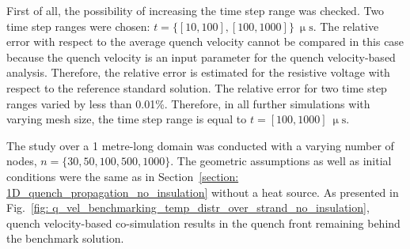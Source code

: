 First of all, the possibility of increasing the time step range was checked. Two time step ranges were chosen: $t=\{[10, 100], [100, 1000]\}~\upmu \text{s}$. The relative error with respect to the average quench velocity cannot be compared in this case because the quench velocity is an input parameter for the quench velocity-based analysis. Therefore, the relative error is estimated for the resistive voltage with respect to the reference standard solution. The relative error for two time step ranges varied by less than 0.01\%. Therefore, in all further simulations with varying mesh size, the time step range is equal to $t=[100, 1000]~\upmu \text{s}$.

The study over a 1 metre-long domain was conducted with a varying number of nodes, $n=\{30, 50, 100, 500, 1000\}$. The geometric assumptions as well as initial conditions were the same as in Section~\ref{section: 1D_quench_propagation_no_insulation} without a heat source. As presented in Fig.~\ref{fig: q_vel_benchmarking_temp_distr_over_strand_no_insulation}, quench velocity-based co-simulation results in the quench front remaining behind the benchmark solution. 

